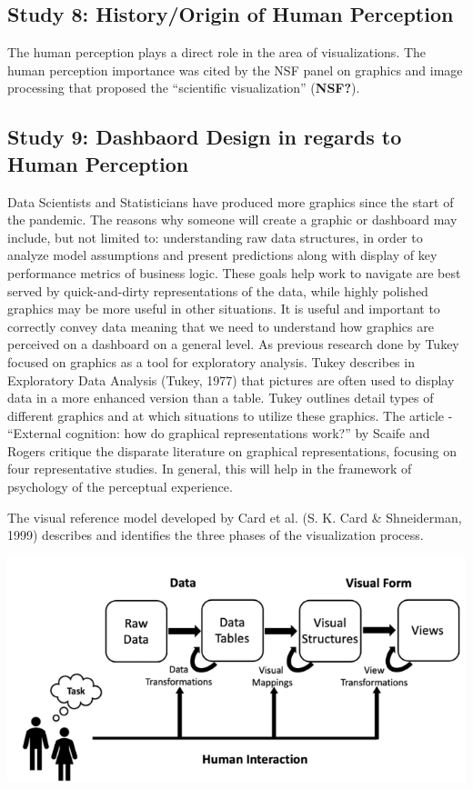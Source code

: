 \documentclass[print]{nuthesis}
\begin{document}
\hypertarget{study-8-historyorigin-of-human-perception}{%
\subsection{Study 8: History/Origin of Human Perception}\label{study-8-historyorigin-of-human-perception}}

The human perception plays a direct role in the area of visualizations. The human perception importance was cited by the NSF panel on graphics and image processing that proposed the ``scientific visualization'' (\textbf{NSF?}).

\hypertarget{study-9-dashbaord-design-in-regards-to-human-perception}{%
\subsection{Study 9: Dashbaord Design in regards to Human Perception}\label{study-9-dashbaord-design-in-regards-to-human-perception}}

Data Scientists and Statisticians have produced more graphics since the start of the pandemic. The reasons why someone will create a graphic or dashboard may include, but not limited to: understanding raw data structures, in order to analyze model assumptions and present predictions along with display of key performance metrics of business logic. These goals help work to navigate are best served by quick-and-dirty representations of the data, while highly polished graphics may be more useful in other situations. It is useful and important to correctly convey data meaning that we need to understand how graphics are perceived on a dashboard on a general level. As previous research done by Tukey focused on graphics as a tool for exploratory analysis. Tukey describes in Exploratory Data Analysis (Tukey, 1977) that pictures are often used to display data in a more enhanced version than a table. Tukey outlines detail types of different graphics and at which situations to utilize these graphics. The article - ``External cognition: how do graphical representations work?'' by Scaife and Rogers critique the disparate literature on graphical representations, focusing on four representative studies. In general, this will help in the framework of psychology of the perceptual experience.

The visual reference model developed by Card et al. (S. K. Card \& Shneiderman, 1999) describes and identifies the three phases of the visualization process.

\includegraphics[width=\textwidth]{figure/VizModelDiagram}
\end{document}
